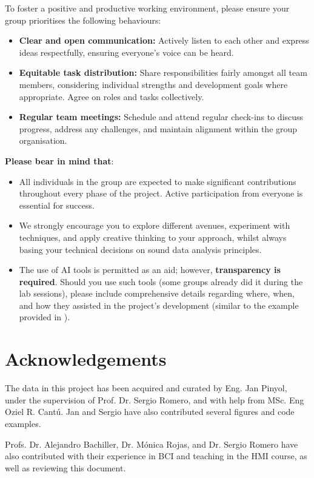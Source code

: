 \documentclass[11pt]{exam}
\begin{document}
    To foster a positive and productive working environment, please ensure your group prioritises the following behaviours:
    \begin{itemize}
        \item \textbf{Clear and open communication:} Actively listen to each other and express ideas respectfully, ensuring everyone's voice can be heard.
        \item \textbf{Equitable task distribution:} Share responsibilities fairly amongst all team members, considering individual strengths and development goals where appropriate. Agree on roles and tasks collectively.
        \item \textbf{Regular team meetings:} Schedule and attend regular check-ins to discuss progress, address any challenges, and maintain alignment within the group organisation.
    \end{itemize}
    \vspace*{5mm}
    \textbf{Please bear in mind that}:
    \begin{itemize}
        \item All individuals in the group are expected to make significant contributions throughout every phase of the project. Active participation from everyone is essential for success.
        \item We strongly encourage you to explore different avenues, experiment with techniques, and apply creative thinking to your approach, whilst always basing your technical decisions on sound data analysis principles.
        \item The use of AI tools is permitted as an aid; however, \textbf{transparency is required}. Should you use such tools (some groups already did it during the lab sessions), please include comprehensive details regarding where, when, and how they assisted in the project's development (similar to the example provided in ).
    \end{itemize}

    \newpage
    \section{Acknowledgements}
    The data in this project has been acquired and curated by Eng. Jan Pinyol, under the supervision of Prof. Dr. Sergio Romero, and with help from MSc. Eng Oziel R. Cantú. Jan and Sergio have also contributed several figures and code examples.

    Profs. Dr. Alejandro Bachiller, Dr. Mónica Rojas, and Dr. Sergio Romero have also contributed with their experience in BCI and teaching in the HMI course, as well as reviewing this document.
\end{document}
